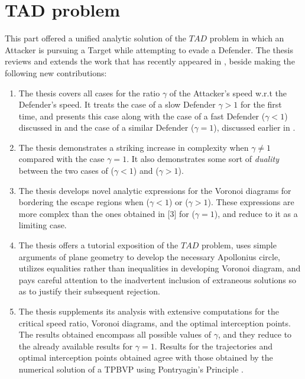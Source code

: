 \section{TAD problem}
This part offered a unified analytic solution of the $TAD$ problem in which an Attacker is pursuing a Target while attempting to evade a Defender. The thesis reviews and extends the work that has recently appeared in \cite{pachter2014active,garcia2015active,garcia2015escape}, beside making the following new contributions:

\begin{enumerate}
\item The thesis covers all cases for the ratio $\gamma$ of the Attacker's speed w.r.t the Defender's speed. It treats the case of a slow Defender $\gamma>1$ for the first time, and presents this case along with the case of a fast Defender ($\gamma<1$) discussed in \cite{garcia2015active} and the case of a similar Defender ($\gamma=1$), discussed earlier in \cite{pachter2014active,garcia2015escape}.
\item The thesis demonstrates a striking increase in complexity when $\gamma\neq1$ compared with the case $\gamma=1$. It also demonstrates some sort of \textit{duality} between the two cases of ($\gamma<1$) and ($\gamma>1$).
\item The thesis develops novel analytic expressions for the Voronoi diagrams for bordering the escape regions when ($\gamma<1$) or ($\gamma>1$). These expressions are more complex than the ones obtained in [3] for ($\gamma=1$), and reduce to it as a limiting case.
\item The thesis offers a tutorial exposition of the $TAD$ problem, uses simple arguments of plane geometry to develop the necessary Apollonius circle, utilizes equalities rather than inequalities in developing Voronoi diagram, and pays careful attention to the inadvertent inclusion of extraneous solutions so as to justify their subsequent rejection.
\item The thesis supplements its analysis with extensive computations for the critical speed ratio, Voronoi diagrams, and the optimal interception points. The results obtained encompass all possible values of $\gamma$, and they reduce to the already available results for $\gamma=1$. Results for the trajectories and optimal interception points obtained agree with those obtained by the numerical solution of a TPBVP using Pontryagin's Principle \cite{garcia2015active}.     
\end{enumerate}  

